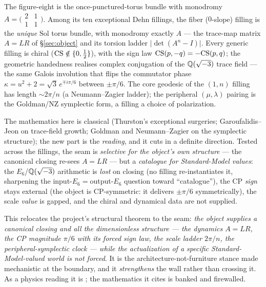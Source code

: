 \begin{proposition}\label{prop:seam}
The figure-eight is the once-punctured-torus bundle with monodromy $A=\big(\begin{smallmatrix}2&1\\1&1\end{smallmatrix}\big)$.
Among its ten exceptional Dehn fillings, the fiber ($0$-slope) filling is the \emph{unique}
$\mathrm{Sol}$ torus bundle, with monodromy exactly $A$ --- the trace-map matrix $A=LR$ of
\S\ref{sec:object} and its torsion ladder $\lvert\det(A^n-I)\rvert$. Every generic filling
is chiral ($\mathrm{CS}\notin\{0,\tfrac12\}$), with the sign law $\mathrm{CS}(p,-q)=-\mathrm{CS}(p,q)$; the
geometric handedness realises complex conjugation of the $\mathbb{Q}(\sqrt{-3})$ trace field --- the
same Galois involution that flips the commutator phase $\kappa=u^2+2=\sqrt3\,e^{\mp i\pi/6}$
between $\pm\pi/6$. The core geodesic of the $(1,n)$ filling has length $\sim 2\pi/n$ (a
Neumann--Zagier ladder); the peripheral $(\mu,\lambda)$ pairing is the Goldman/NZ symplectic
form, a filling a choice of polarization.
\end{proposition}

The mathematics here is classical (Thurston's exceptional surgeries; Garoufalidis--Jeon on
trace-field growth; Goldman and Neumann--Zagier on the symplectic structure); the new part
is the \emph{reading}, and it cuts in a definite direction. Tested across the fillings, the
seam is \emph{selective for the object's own structure} --- the canonical closing re-sees
$A=LR$ --- but a \emph{catalogue for Standard-Model values}: the $E_6$/$\mathbb{Q}(\sqrt{-3})$
arithmetic is \emph{lost} on closing (no filling re-instantiates it, sharpening the
input-$E_6=$output-$E_6$ question toward ``catalogue''), the CP \emph{sign} stays external
(the object is CP-symmetric: it delivers $\pm\pi/6$ symmetrically), the scale \emph{value}
is gapped, and the chiral and dynamical data are not supplied.

\begin{remark}[\sPost]\label{rem:structural-theorem}
This relocates the project's structural theorem to the seam: \emph{the object supplies a
canonical closing and all the dimensionless structure --- the dynamics $A=LR$, the CP
magnitude $\pi/6$ with its forced sign law, the scale ladder $2\pi/n$, the
peripheral-symplectic clock --- while the actualization of a specific Standard-Model-valued
world is not forced}. It is the architecture-not-furniture stance made mechanistic at the
boundary, and it \emph{strengthens} the wall rather than crossing it. As a physics reading
it is \sPost; the mathematics it cites is banked and firewalled.
\end{remark}


